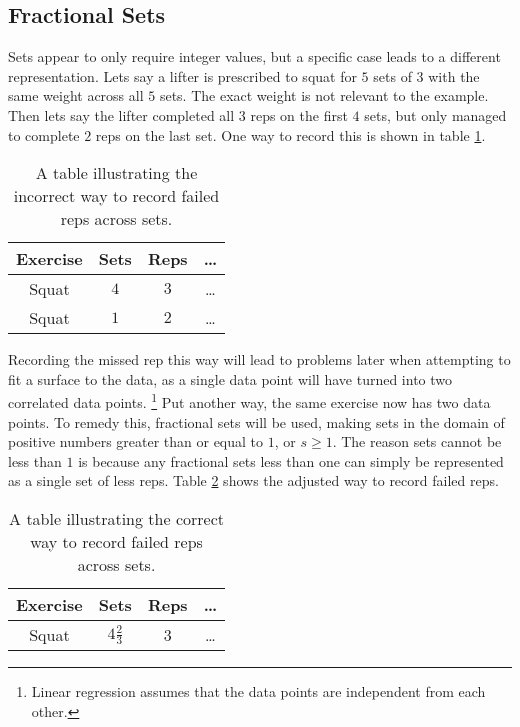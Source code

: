 \subsection{Fractional Sets}
\label{sec:FractionalSets}

Sets appear to only require integer values, but a specific case leads to a different representation. Lets say a lifter is prescribed to squat for $5$ sets of $3$ with the same weight across all $5$ sets. The exact weight is not relevant to the example. Then lets say the lifter completed all $3$ reps on the first $4$ sets, but only managed to complete $2$ reps on the last set. One way to record this is shown in table \ref{tab:FailedSetExampleIncorrectData}.

\begin{table}[h]
    \centering
    \begin{tabular}{c|c|c|c}
        Exercise & Sets & Reps & \dots \\
        \hline
        Squat & $4$ & $3$ & \dots \\
        Squat & $1$ & $2$ & \dots \\ 
    \end{tabular}
    \caption{A table illustrating the incorrect way to record failed reps across sets.}
    \label{tab:FailedSetExampleIncorrectData}
\end{table}

Recording the missed rep this way will lead to problems later when attempting to fit a surface to the data, as a single data point will have turned into two correlated data points. \footnote{Linear regression assumes that the data points are independent from each other.} Put another way, the same exercise now has two data points. To remedy this, fractional sets will be used, making sets in the domain of positive numbers greater than or equal to $1$, or $s\ge 1$. The reason sets cannot be less than $1$ is because any fractional sets less than one can simply be represented as a single set of less reps. Table \ref{tab:FailedSetExampleCorrectData} shows the adjusted way to record failed reps.

\begin{table}[h]
    \centering
    \begin{tabular}{c|c|c|c}
        Exercise & Sets & Reps & \dots \\
        \hline
        Squat & $4\frac{2}{3}$ & 3 & \dots \\
    \end{tabular}
    \caption{A table illustrating the correct way to record failed reps across sets.}
    \label{tab:FailedSetExampleCorrectData}
\end{table}

